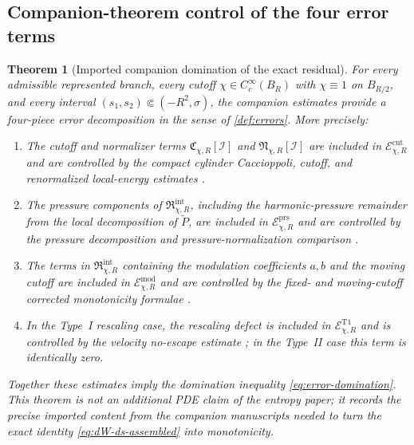 \documentclass[11pt]{amsart}
\numberwithin{equation}{section}
\theoremstyle{plain}
\newtheorem{theorem}{Theorem}[section]
\theoremstyle{definition}
\theoremstyle{remark}
\newcommand{\Err}{\mathcal E}
\begin{document}
\subsection{Companion-theorem control of the four error terms}

\begin{theorem}[Imported companion domination of the exact residual]
\label{ass:companion-error-domination}
\label{imp:exact-error-domination}
For every admissible represented branch, every cutoff
\(\chi\in C_c^\infty(B_R)\) with \(\chi\equiv1\) on \(B_{R/2}\), and every
interval \((s_1,s_2)\Subset(-R^2,\sigma)\), the companion estimates provide
a four-piece error decomposition in the sense of \cref{def:errors}.  More
precisely:
\begin{enumerate}[label=\textup{(\roman*)},leftmargin=2.2em]
	\item The cutoff and normalizer terms
	\(\mathfrak C_{\chi,R}[\mathcal I]\) and
	\(\mathfrak N_{\chi,R}[\mathcal I]\) are included in
	\(\Err^{\mathrm{cut}}_{\chi,R}\) and are controlled by the compact
	cylinder Caccioppoli, cutoff, and renormalized local-energy estimates
	\cite[Theorem~5.4 and Proposition~5.1]{BallesterTypeII}.

	\item The pressure components of
	\(\mathfrak R_{\chi,R}^{\mathrm{int}}\), including the harmonic-pressure
	remainder from the local decomposition of \(\widetilde P\), are included
	in \(\Err^{\mathrm{prs}}_{\chi,R}\) and are controlled by the pressure
	decomposition and pressure-normalization comparison
	\cite[Theorem~3.26 and Lemma~5.3]{BallesterTypeII}.

	\item The terms in \(\mathfrak R_{\chi,R}^{\mathrm{int}}\) containing
	the modulation coefficients \(a,b\) and the moving cutoff are included in
	\(\Err^{\mathrm{mod}}_{\chi,R}\) and are controlled by the fixed- and
	moving-cutoff corrected monotonicity formulae
	\cite[Theorems~9.11 and~9.19]{BallesterTypeII}.

	\item In the Type~I rescaling case, the rescaling defect is included in
	\(\Err^{\mathrm{T1}}_{\chi,R}\) and is controlled by the velocity
	no-escape estimate \cite[Theorem~6.5]{BallesterSetup}; in the
	Type~II case this term is identically zero.
\end{enumerate}
Together these estimates imply the domination inequality
\eqref{eq:error-domination}.  This theorem is not an additional PDE
claim of the entropy paper; it records the precise imported content from the
companion manuscripts needed to turn the exact identity
\eqref{eq:dW-ds-assembled} into monotonicity.
\end{theorem}
\end{document}

